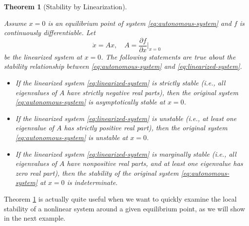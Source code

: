 \documentclass[
]{book}
\newtheorem{theorem}{Theorem}[chapter]
\theoremstyle{definition}
\theoremstyle{definition}
\theoremstyle{definition}
\theoremstyle{definition}
\theoremstyle{remark}
\begin{document}
\begin{theorem}[Stability by Linearization]
\protect\hypertarget{thm:stabilitybylinearization}{}\label{thm:stabilitybylinearization}

Assume \(x=0\) is an equilibrium point of system \eqref{eq:autonomous-system} and \(f\) is continuously differentiable. Let
\begin{equation}
\dot{x} = Ax, \quad A = \frac{\partial f}{\partial x} \Big\vert_{x=0}
\label{eq:linearized-system}
\end{equation}
be the linearized system at \(x=0\). The following statements are true about the stability relationship between \eqref{eq:autonomous-system} and \eqref{eq:linearized-system}.

\begin{itemize}
\item
  If the linearized system \eqref{eq:linearized-system} is strictly stable (i.e., all eigenvalues of \(A\) have strictly negative real parts), then the original system \eqref{eq:autonomous-system} is asymptotically stable at \(x=0\).
\item
  If the linearized system \eqref{eq:linearized-system} is unstable (i.e., at least one eigenvalue of \(A\) has strictly positive real part), then the original system \eqref{eq:autonomous-system} is unstable at \(x=0\).
\item
  If the linearized system \eqref{eq:linearized-system} is marginally stable (i.e., all eigenvalues of \(A\) have nonpositive real parts, and at least one eigenvalue has zero real part), then the stability of the original system \eqref{eq:autonomous-system} at \(x=0\) is indeterminate.
\end{itemize}

\end{theorem}

Theorem \ref{thm:stabilitybylinearization} is actually quite useful when we want to quickly examine the local stability of a nonlinear system around a given equilibrium point, as we will show in the next example.
\end{document}
